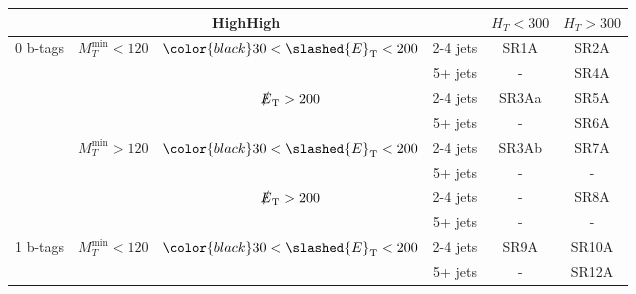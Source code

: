 \documentclass[plain,landscape]{article}
\newcommand{\met}{\slashed{E}_\mathrm{T}}
\begin{document}
\begin{table}
\renewcommand{\arraystretch}{1.3}
\centering
\begin{tabular}{|c|c|c|c|c|c|}
\hline
\multicolumn{4}{|c|}{ \textbf{HighHigh} }                      & $H_T < 300$ & $ H_T > 300$  \\ \hline
\multirow{8}{*}{0 b-tags}    & \multirow{4}{*}{$M_T^{\textrm{min}} < 120$} & \multirow{2}{*}{ ${\color{black} 30} < \met < 200$} & 2-4 jets    & SR1A                    & SR2A \\ \cline{4-6}
                             &                                             &                                              & 5+ jets     & -                       & SR4A  \\ \cline{3-6}
                             &                                             & \multirow{2}{*}{$\met > 200$}                & 2-4 jets    & SR3Aa                   & SR5A  \\ \cline{4-6}
                             &                                             &                                              & 5+ jets     & -                       & SR6A   \\ \cline{2-6}
                             & \multirow{4}{*}{$M_T^{\textrm{min}} > 120$} & \multirow{2}{*}{ ${\color{black} 30} < \met < 200$} & 2-4 jets    & SR3Ab                   & SR7A  \\ \cline{4-6}
                             &                                             &                                              & 5+ jets     & -                       & - \\ \cline{3-6}
                             &                                             & \multirow{2}{*}{$\met > 200$}                & 2-4 jets    & -                       & SR8A   \\ \cline{4-6}
                             &                                             &                                              & 5+ jets     & -                       & - \\ \cline{1-6}
\multirow{8}{*}{1 b-tags}    & \multirow{4}{*}{$M_T^{\textrm{min}} < 120$} & \multirow{2}{*}{ ${\color{black} 30} < \met < 200$} & 2-4 jets    & SR9A                    & SR10A  \\ \cline{4-6}
                             &                                             &                                              & 5+ jets     & -                       & SR12A  \\ \cline{3-6}

\end{tabular}
\end{table}
\end{document}
